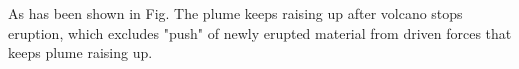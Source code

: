 
As has been shown in Fig. The plume keeps raising up after volcano stops eruption, which excludes "push" of newly erupted material from driven forces that keeps plume raising up.

%
%
%
